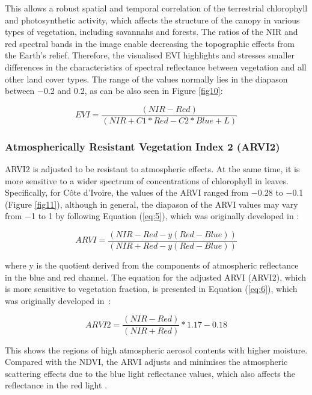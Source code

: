 \documentclass[jimaging,article,accept,pdftex,moreauthors]{Definitions/mdpi}
\begin{document}
This allows a robust spatial and temporal correlation of the terrestrial chlorophyll and photosynthetic activity, which affects the structure of the canopy in various types of vegetation, including savannahs and forests. The ratios of the NIR and red spectral bands in the image enable decreasing the topographic effects from the Earth's relief. Therefore, the visualised EVI highlights and stresses smaller differences in the characteristics of spectral reflectance between vegetation and all other land cover types. The range of the values normally lies in the diapason between $-$0.2 and 0.2, as can be also seen in Figure \ref{fig10}:
 
\begin{equation}\label{eq:3}
EVI=\dfrac{(NIR-Red)}{(NIR+C1*Red-C2*Blue+L)}
\end{equation}

\subsubsection{Atmospherically Resistant Vegetation Index 2 (ARVI2)}

ARVI2 is adjusted to be resistant to atmospheric effects{. At} the same time, it is more sensitive to a wider spectrum of concentrations of chlorophyll in leaves. {Specifically, for} Côte d'Ivoire, the values of the ARVI ranged from $-$0.28 to $-$0.1 (Figure \ref{fig11}), although in general, the diapason of the ARVI values may vary from $-$1 to 1 by following Equation (\ref{eq:5}), {which was originally developed in} \cite{134076}: 

\begin{equation}\label{eq:5}
ARVI=\dfrac{(NIR-Red-y(Red-Blue))}{(NIR+Red-y(Red-Blue))}
\end{equation}

where y is the quotient derived from the components of atmospheric reflectance in the blue and red channel{.
The equation for the }adjusted ARVI (ARVI2), which is more sensitive to vegetation fraction, is {presented} in Equation (\ref{eq:6}), {which was originally developed in}~\cite{134076}: 

\begin{equation}\label{eq:6}
ARVI2=\dfrac{(NIR-Red)}{(NIR+Red)}*1.17 - 0.18
\end{equation}

This shows the regions of high atmospheric aerosol contents with higher moisture. Compared with the NDVI,{ }the ARVI adjusts and minimises the atmospheric scattering effects due to the blue light reflectance values, which also affects the reflectance in the red light \cite{134076}. 
\end{document}
